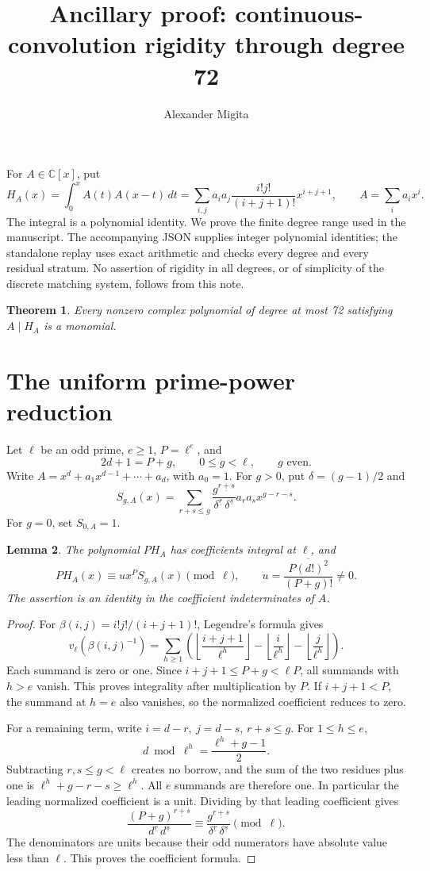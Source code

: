 \documentclass[11pt]{article}
\title{Ancillary proof: continuous-convolution rigidity through degree 72}
\author{Alexander Migita}
\date{}
\newtheorem{theorem}{Theorem}
\newtheorem{lemma}[theorem]{Lemma}
\newcommand{\CC}{\mathbb C}
\newcommand{\ff}[2]{#1^{\underline{#2}}}
\begin{document}
\maketitle

For \(A\in\CC[x]\), put
\[
 H_A(x)=\int_0^xA(t)A(x-t)\,dt
 =\sum_{i,j}a_ia_j\frac{i!j!}{(i+j+1)!}x^{i+j+1},
 \qquad A=\sum_i a_ix^i.
\]
The integral is a polynomial identity.
We prove the finite degree range used in the manuscript.
The accompanying JSON supplies integer polynomial identities; the
standalone replay uses exact arithmetic and checks every degree and
every residual stratum. No assertion of rigidity in all degrees, or of
simplicity of the discrete matching system, follows from this note.

\begin{theorem}
Every nonzero complex polynomial of degree at most 72 satisfying
\(A\mid H_A\) is a monomial.
\end{theorem}

\section{The uniform prime-power reduction}

Let \(\ell\) be an odd prime, \(e\ge1\), \(P=\ell^e\), and
\[
 2d+1=P+g,\qquad 0\le g<\ell,\qquad g\text{ even}.
\]
Write \(A=x^d+a_1x^{d-1}+\cdots+a_d\), with \(a_0=1\).
For \(g>0\), put \(\delta=(g-1)/2\) and
\[
 S_{g,A}(x)=
 \sum_{r+s\le g}
 \frac{\ff g{r+s}}{\ff\delta r\,\ff\delta s}
 a_ra_sx^{g-r-s}.
\]
For \(g=0\), set \(S_{0,A}=1\).

\begin{lemma}
The polynomial \(P H_A\) has coefficients integral at \(\ell\), and
\[
 P H_A(x)\equiv u x^P S_{g,A}(x)\pmod\ell,\qquad
 u=\overline{\frac{P(d!)^2}{(P+g)!}}\ne0.
\]
The assertion is an identity in the coefficient indeterminates of \(A\).
\end{lemma}

\begin{proof}
For \(\beta(i,j)=i!j!/(i+j+1)!\), Legendre's formula gives
\[
 v_\ell(\beta(i,j)^{-1})=
 \sum_{h\ge1}
 \left(\left\lfloor\frac{i+j+1}{\ell^h}\right\rfloor
       -\left\lfloor\frac i{\ell^h}\right\rfloor
       -\left\lfloor\frac j{\ell^h}\right\rfloor\right).
\]
Each summand is zero or one.
Since \(i+j+1\le P+g<\ell P\), all summands with \(h>e\) vanish.
This proves integrality after multiplication by \(P\).
If \(i+j+1<P\), the summand at \(h=e\) also vanishes, so the
normalized coefficient reduces to zero.

For a remaining term, write \(i=d-r,\ j=d-s\), \(r+s\le g\).
For \(1\le h\le e\),
\[
 d\bmod\ell^h=\frac{\ell^h+g-1}{2}.
\]
Subtracting \(r,s\le g<\ell\) creates no borrow, and the sum of the
two residues plus one is \(\ell^h+g-r-s\ge\ell^h\).
All \(e\) summands are therefore one.
In particular the leading normalized coefficient is a unit.
Dividing by that leading coefficient gives
\[
 \frac{\ff{(P+g)}{r+s}}{\ff d r\,\ff d s}
 \equiv
 \frac{\ff g{r+s}}{\ff\delta r\,\ff\delta s}\pmod\ell.
\]
The denominators are units because their odd numerators have absolute
value less than \(\ell\). This proves the coefficient formula.
\end{proof}
\end{document}
